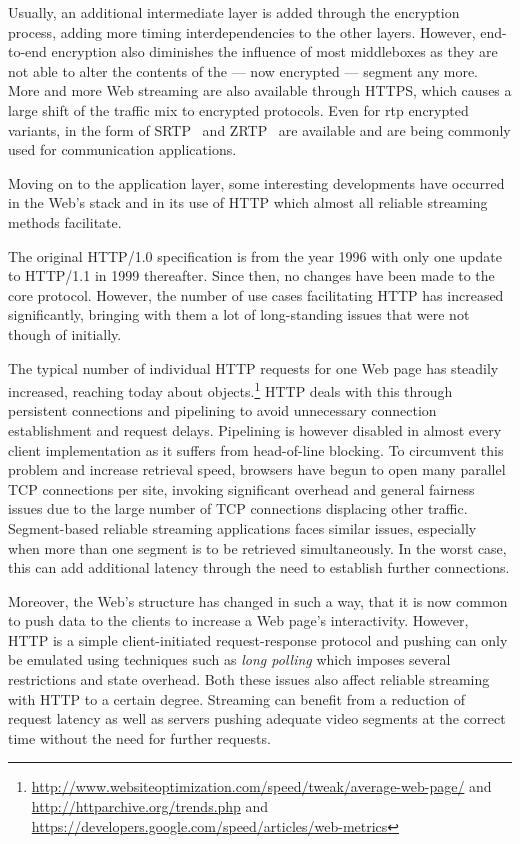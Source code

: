 Usually, an additional intermediate layer is added through the encryption process, adding more timing interdependencies to the other layers. However, end-to-end encryption also diminishes the influence of most middleboxes as they are not able to alter the contents of the --- now encrypted --- segment any more. More and more Web streaming are also available through \gls{HTTPS}, which causes a large shift of the traffic mix to encrypted protocols. Even for \gls{rtp} encrypted variants, in the form of SRTP~\cite{rfc3711} and ZRTP~\cite{rfc6189} are available and are being commonly used for communication applications.

Moving on to the application layer, some interesting developments have occurred in the Web's stack and in its use of \gls{HTTP} which almost all reliable streaming methods facilitate.

The original HTTP/1.0 specification is from the year 1996 with only one update to HTTP/1.1 in 1999 thereafter. Since then, no changes have been made to the core protocol. However, the number of use cases facilitating \gls{HTTP} has increased significantly, bringing with them a lot of long-standing issues that were not though of initially.

The typical number of individual \gls{HTTP} requests for one Web page has steadily increased, reaching today about  objects.\footnote{\url{http://www.websiteoptimization.com/speed/tweak/average-web-page/} and \url{http://httparchive.org/trends.php} and \url{https://developers.google.com/speed/articles/web-metrics}} \gls{HTTP} deals with this through persistent connections and pipelining to avoid unnecessary connection establishment and request delays. Pipelining is however disabled in almost every client implementation as it suffers from head-of-line blocking. To circumvent this problem and increase retrieval speed, browsers have begun to open many parallel \gls{TCP} connections per site, invoking significant overhead and general fairness issues due to the large number of \gls{TCP} connections displacing other traffic. Segment-based reliable streaming applications faces similar issues, especially when more than one segment is to be retrieved simultaneously. In the worst case, this can add additional latency through the need to establish further connections.

Moreover, the Web's structure has changed in such a way, that it is now common to push data to the clients to increase a Web page's interactivity. However, \gls{HTTP} is a simple client-initiated request-response protocol and pushing can only be emulated using techniques such as \textit{long polling} which imposes several restrictions and state overhead. Both these issues also affect reliable streaming with \gls{HTTP} to a certain degree. Streaming can benefit from a reduction of request latency as well as servers pushing adequate video segments at the correct time without the need for further requests.

